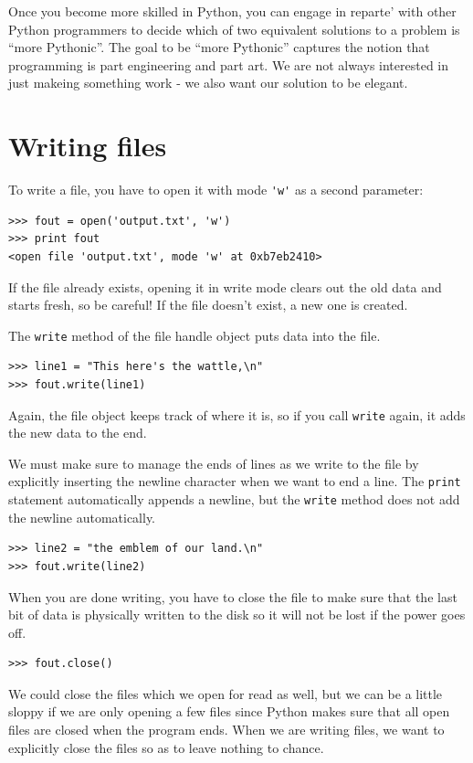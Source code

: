 \documentclass[10pt]{book}
\begin{document}
Once you become more skilled in Python, you can engage
in reparte' with other Python programmers to decide
which of two equivalent solutions to a problem is 
``more Pythonic''.  The goal to be ``more Pythonic'' 
captures the notion that programming is part engineering
and part art.  We are not always interested
in just makeing something work - we also want
our solution to be elegant.


\section{Writing files}


To write a file, you have to open it with mode
\verb"'w'" as a second parameter:

\beforeverb
\begin{verbatim}
>>> fout = open('output.txt', 'w')
>>> print fout
<open file 'output.txt', mode 'w' at 0xb7eb2410>
\end{verbatim}
\afterverb
%
If the file already exists, opening it in write mode clears out
the old data and starts fresh, so be careful!
If the file doesn't exist, a new one is created.

The {\tt write} method of the file handle object 
puts data into the file.

\beforeverb
\begin{verbatim}
>>> line1 = "This here's the wattle,\n"
>>> fout.write(line1)
\end{verbatim}
\afterverb
%
Again, the file object keeps track of where it is, so if
you call {\tt write} again, it adds the new data to the end.

We must make sure to manage the ends of lines as we write
to the file by explicitly inserting the newline character
when we want to end a line.  The {\tt print} statement 
automatically appends a newline, but the {\tt write} 
method does not add the newline automatically.

\beforeverb
\begin{verbatim}
>>> line2 = "the emblem of our land.\n"
>>> fout.write(line2)
\end{verbatim}
\afterverb
%
When you are done writing, you have to close the file
to make sure that the last bit of data is physically written
to the disk so it will not be lost if the power goes off.

\beforeverb
\begin{verbatim}
>>> fout.close()
\end{verbatim}
\afterverb
%
We could close the files which we open for read as well, 
but we can be a little sloppy if we are only opening a few
files since Python makes sure that all open files are 
closed when the program ends.  When we are writing files, 
we want to explicitly close the files so as to leave nothing
to chance.
\end{document}
